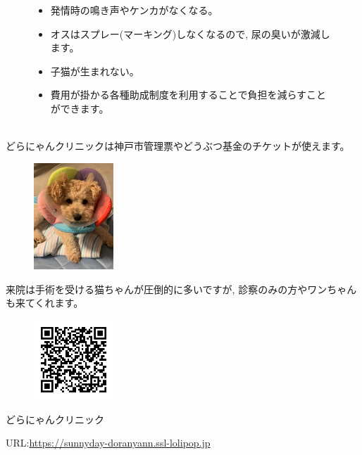 \documentclass{jsarticle}
\begin{document}
	\begin{figure}[htbp]
		\Large
		\centering
		\begin{minipage}{0.4\columnwidth}
			\begin{itemize}
				\item 発情時の鳴き声やケンカがなくなる。
				\item オスはスプレー(マーキング)しなくなるので, 尿の臭いが激減します。
				\item 子猫が生まれない。
			\end{itemize}
		\end{minipage}
		\begin{minipage}{0.4\columnwidth}
			\begin{itemize}
				\item 費用が掛かる各種助成制度を利用することで負担を減らすことができます。\\\\
			\end{itemize}
		\end{minipage}
	\end{figure}

	どらにゃんクリニックは神戸市管理票やどうぶつ基金のチケットが使えます。

	\vspace{30pt}
	\begin{figure}
		\vspace*{-\intextsep}
		\includegraphics[width=3cm]{5.jpg}
	\end{figure}
	来院は手術を受ける猫ちゃんが圧倒的に多いですが, 診察のみの方やワンちゃんも来てくれます。

	\vspace{30pt}
	\begin{figure}
		\vspace*{-\intextsep}
		\includegraphics[width=3cm]{URLdoranyan.png}
	\end{figure}
	どらにゃんクリニック

	URL:\url{https://sunnyday-doranyann.ssl-lolipop.jp}
\end{document}

